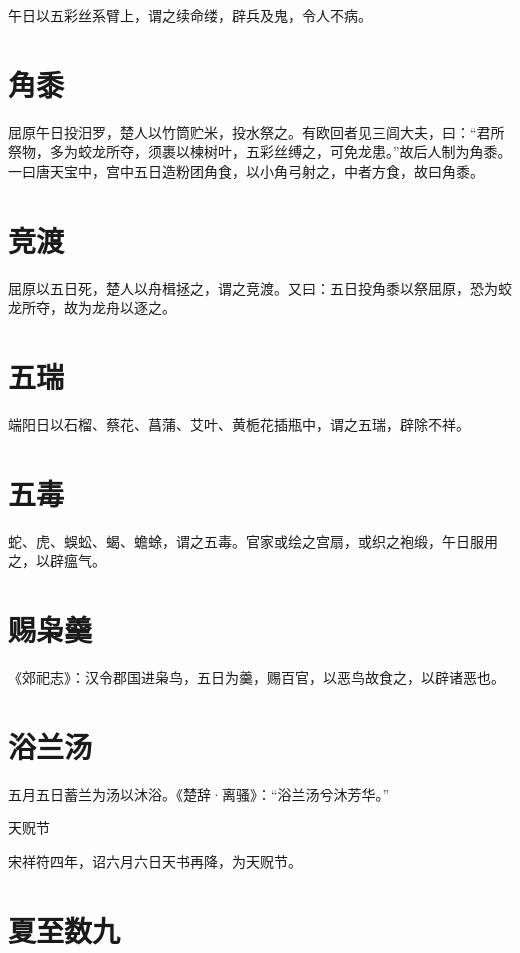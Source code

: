 \documentclass[a4paper,12pt,UTF8,twoside]{ctexbook}
\begin{document}
	午日以五彩丝系臂上，谓之续命缕，辟兵及鬼，令人不病。
	
	\section{角黍}
	
	屈原午日投汨罗，楚人以竹筒贮米，投水祭之。有欧回者见三闾大夫，曰：“君所祭物，多为蛟龙所夺，须裹以楝树叶，五彩丝缚之，可免龙患。”故后人制为角黍。一曰唐天宝中，宫中五日造粉团角食，以小角弓射之，中者方食，故曰角黍。
	
	\section{竞渡}
	
	屈原以五日死，楚人以舟楫拯之，谓之竞渡。又曰：五日投角黍以祭屈原，恐为蛟龙所夺，故为龙舟以逐之。
	
	\section{五瑞}
	
	端阳日以石榴、蔡花、菖蒲、艾叶、黄栀花插瓶中，谓之五瑞，辟除不祥。
	
	\section{五毒}
	
	蛇、虎、蜈蚣、蝎、蟾蜍，谓之五毒。官家或绘之宫扇，或织之袍缎，午日服用之，以辟瘟气。
	
	\section{赐枭羹}
	
	《郊祀志》：汉令郡国进枭鸟，五日为羹，赐百官，以恶鸟故食之，以辟诸恶也。
	
	\section{浴兰汤}
	
	五月五日蓄兰为汤以沐浴。《楚辞·离骚》：“浴兰汤兮沐芳华。”
	
	天贶节
	
	宋祥符四年，诏六月六日天书再降，为天贶节。
	
	\section{夏至数九}
	
\end{document}
